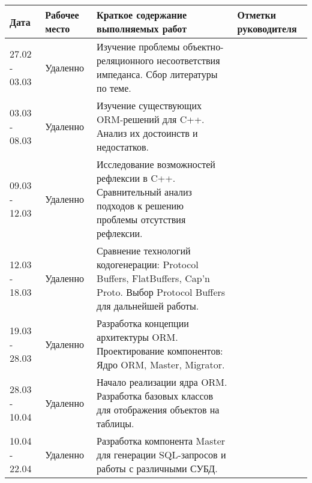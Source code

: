 \begin{table}[h]
\centering
\small
\begin{tabular}{|p{2.5cm}|p{3cm}|p{8cm}|p{1.5cm}|}
\hline
\textbf{Дата} & \textbf{Рабочее место} & \textbf{Краткое содержание выполняемых работ} & \textbf{Отметки руководителя} \\
\hline
27.02 - 03.03 & Удаленно & Изучение проблемы объектно-реляционного несоответствия импеданса. Сбор литературы по теме. & \\
\hline
03.03 - 08.03 & Удаленно & Изучение существующих ORM-решений для C++. Анализ их достоинств и недостатков. & \\
\hline
09.03 - 12.03 & Удаленно & Исследование возможностей рефлексии в C++. Сравнительный анализ подходов к решению проблемы отсутствия рефлексии. & \\
\hline
12.03 - 18.03 & Удаленно & Сравнение технологий кодогенерации: Protocol Buffers, FlatBuffers, Cap'n Proto. Выбор Protocol Buffers для дальнейшей работы. & \\
\hline
19.03 - 28.03 & Удаленно & Разработка концепции архитектуры ORM. Проектирование компонентов: Ядро ORM, Master, Migrator. & \\
\hline
28.03 - 10.04 & Удаленно & Начало реализации ядра ORM. Разработка базовых классов для отображения объектов на таблицы. & \\
\hline
10.04 - 22.04 & Удаленно & Разработка компонента Master для генерации SQL-запросов и работы с различными СУБД. & \\
\hline
\end{tabular}
\end{table}
